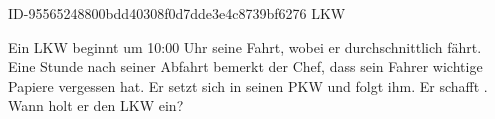 \begin{exercise}
      {ID-95565248800bdd40308f0d7dde3e4c8739bf6276}
      {LKW}
  \ifproblem\problem\par
    Ein LKW beginnt um 10:00 Uhr seine Fahrt, wobei er durchschnittlich 
    fährt. Eine Stunde nach seiner Abfahrt bemerkt der Chef, dass sein Fahrer
    wichtige Papiere vergessen hat. Er setzt sich in seinen PKW und folgt ihm.
    Er schafft . Wann holt er den LKW ein?
  \fi
\end{exercise}
